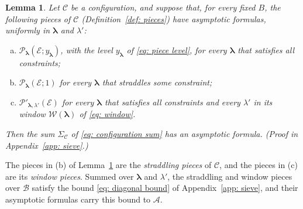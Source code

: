 \documentclass{article}
\numberwithin{equation}{section}
\newtheorem{lemma}{Lemma}
\begin{document}
\begin{lemma}
\label{lem: decoupling}
Let $\mathcal{C}$ be a configuration, and suppose that, for every fixed $B$, the following pieces of $\mathcal{C}$ (Definition~\ref{def: pieces}) have asymptotic formulas, uniformly in $\boldsymbol{\lambda}$ and $\lambda'$:
\begin{enumerate}[(a)]
\item $\mathcal{P}_{\boldsymbol{\lambda}}(\mathcal{E}; y_{\boldsymbol{\lambda}})$, with the level $y_{\boldsymbol{\lambda}}$ of \eqref{eq: piece level}, for every $\boldsymbol{\lambda}$ that satisfies all constraints;
\item $\mathcal{P}_{\boldsymbol{\lambda}}(\mathcal{E}; 1)$ for every $\boldsymbol{\lambda}$ that straddles some constraint;
\item $\mathcal{P}'_{\boldsymbol{\lambda},\lambda'}(\mathcal{E})$ for every $\boldsymbol{\lambda}$ that satisfies all constraints and every $\lambda'$ in its window $\mathcal{W}(\boldsymbol{\lambda})$ of \eqref{eq: window}.
\end{enumerate}
Then the sum $\Sigma_{\mathcal{C}}$ of \eqref{eq: configuration sum} has an asymptotic formula.
\emph{(Proof in Appendix~\ref{app: sieve}.)}
\end{lemma}

The pieces in (b) of Lemma~\ref{lem: decoupling} are the \emph{straddling pieces} of $\mathcal{C}$, and the pieces in (c) are its \emph{window pieces}. Summed over $\boldsymbol{\lambda}$ and $\lambda'$, the straddling and window pieces over $\mathcal{B}$ satisfy the bound \eqref{eq: diagonal bound} of Appendix~\ref{app: sieve}, and their asymptotic formulas carry this bound to $\mathcal{A}$.
\end{document}
